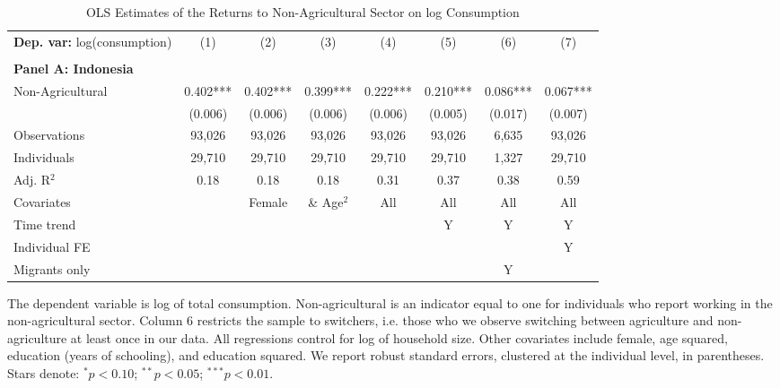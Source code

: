 \begin{table}[htbp] \centering \begin{threeparttable}
 \caption{OLS Estimates of the Returns to Non-Agricultural Sector on log Consumption} 
 \label{tab:OLS_cons_nonag_unb_noag} 
\begin{tabular}{l ccccccc} \toprule  \textbf{Dep. var:}  log(consumption) 
                    &\multicolumn{1}{c}{(1)}   &\multicolumn{1}{c}{(2)}   &\multicolumn{1}{c}{(3)}   &\multicolumn{1}{c}{(4)}   &\multicolumn{1}{c}{(5)}   &\multicolumn{1}{c}{(6)}   &\multicolumn{1}{c}{(7)}   \\
                    &               &               &               &               &               &               &               \\
\textbf{Panel A: Indonesia} \\
Non-Agricultural              &       0.402***&       0.402***&       0.399***&       0.222***&       0.210***&       0.086***&       0.067***\\
                    &     (0.006)   &     (0.006)   &     (0.006)   &     (0.006)   &     (0.005)   &     (0.017)   &     (0.007)   \\
\addlinespace
Observations        &      93,026   &      93,026   &      93,026   &      93,026   &      93,026   &       6,635   &      93,026   \\
Individuals         &      29,710   &      29,710   &      29,710   &      29,710   &      29,710   &       1,327   &      29,710   \\
Adj. R$^{2}$        &        0.18   &        0.18   &        0.18   &        0.31   &        0.37   &        0.38   &        0.59   \\
\cmidrule{2 -8} Covariates & & Female & \& Age$^2$ & All & All & All & All  \\ Time trend & & & & & Y & Y & Y  \\ Individual FE & & & & & & & Y  \\ Migrants only & & & & & & Y &  \\ \bottomrule \end{tabular} \begin{tablenotes} \footnotesize \item{The dependent variable is log of total consumption. Non-agricultural is an indicator equal to one for individuals who report working in the non-agricultural sector. Column 6 restricts the sample to switchers, i.e. those who we observe switching between agriculture and non-agriculture at least once in our data. All regressions control for log of household size. Other covariates include female, age squared, education (years of schooling), and education squared. We report robust standard errors, clustered at the individual level, in parentheses. Stars denote: $^{*} p<0.10$; $^{**} p<0.05$; $^{***} p<0.01$.} \end{tablenotes} \end{threeparttable} \end{table}

